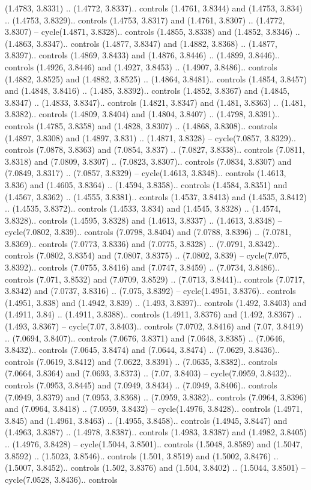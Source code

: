 (1.4783, 3.8331) .. (1.4772, 3.8337).. controls (1.4761, 3.8344) and (1.4753, 3.834) .. (1.4753, 3.8329).. controls (1.4753, 3.8317) and (1.4761, 3.8307) .. (1.4772, 3.8307) -- cycle(1.4871, 3.8328).. controls (1.4855, 3.8338) and (1.4852, 3.8346) .. (1.4863, 3.8347).. controls (1.4877, 3.8347) and (1.4882, 3.8368) .. (1.4877, 3.8397).. controls (1.4869, 3.8433) and (1.4876, 3.8446) .. (1.4899, 3.8446).. controls (1.4926, 3.8446) and (1.4927, 3.8453) .. (1.4907, 3.8486).. controls (1.4882, 3.8525) and (1.4882, 3.8525) .. (1.4864, 3.8481).. controls (1.4854, 3.8457) and (1.4848, 3.8416) .. (1.485, 3.8392).. controls (1.4852, 3.8367) and (1.4845, 3.8347) .. (1.4833, 3.8347).. controls (1.4821, 3.8347) and (1.481, 3.8363) .. (1.481, 3.8382).. controls (1.4809, 3.8404) and (1.4804, 3.8407) .. (1.4798, 3.8391).. controls (1.4785, 3.8358) and (1.4828, 3.8307) .. (1.4868, 3.8308).. controls (1.4897, 3.8308) and (1.4897, 3.831) .. (1.4871, 3.8328) -- cycle(7.0857, 3.8329).. controls (7.0878, 3.8363) and (7.0854, 3.837) .. (7.0827, 3.8338).. controls (7.0811, 3.8318) and (7.0809, 3.8307) .. (7.0823, 3.8307).. controls (7.0834, 3.8307) and (7.0849, 3.8317) .. (7.0857, 3.8329) -- cycle(1.4613, 3.8348).. controls (1.4613, 3.836) and (1.4605, 3.8364) .. (1.4594, 3.8358).. controls (1.4584, 3.8351) and (1.4567, 3.8362) .. (1.4555, 3.8381).. controls (1.4537, 3.8413) and (1.4535, 3.8412) .. (1.4535, 3.8372).. controls (1.4533, 3.834) and (1.4545, 3.8328) .. (1.4574, 3.8328).. controls (1.4595, 3.8328) and (1.4613, 3.8337) .. (1.4613, 3.8348) -- cycle(7.0802, 3.839).. controls (7.0798, 3.8404) and (7.0788, 3.8396) .. (7.0781, 3.8369).. controls (7.0773, 3.8336) and (7.0775, 3.8328) .. (7.0791, 3.8342).. controls (7.0802, 3.8354) and (7.0807, 3.8375) .. (7.0802, 3.839) -- cycle(7.075, 3.8392).. controls (7.0755, 3.8416) and (7.0747, 3.8459) .. (7.0734, 3.8486).. controls (7.071, 3.8532) and (7.0709, 3.8529) .. (7.0713, 3.8441).. controls (7.0717, 3.8342) and (7.0737, 3.8316) .. (7.075, 3.8392) -- cycle(1.4951, 3.8376).. controls (1.4951, 3.838) and (1.4942, 3.839) .. (1.493, 3.8397).. controls (1.492, 3.8403) and (1.4911, 3.84) .. (1.4911, 3.8388).. controls (1.4911, 3.8376) and (1.492, 3.8367) .. (1.493, 3.8367) -- cycle(7.07, 3.8403).. controls (7.0702, 3.8416) and (7.07, 3.8419) .. (7.0694, 3.8407).. controls (7.0676, 3.8371) and (7.0648, 3.8385) .. (7.0646, 3.8432).. controls (7.0645, 3.8474) and (7.0644, 3.8474) .. (7.0629, 3.8436).. controls (7.0619, 3.8412) and (7.0622, 3.8391) .. (7.0635, 3.8382).. controls (7.0664, 3.8364) and (7.0693, 3.8373) .. (7.07, 3.8403) -- cycle(7.0959, 3.8432).. controls (7.0953, 3.8445) and (7.0949, 3.8434) .. (7.0949, 3.8406).. controls (7.0949, 3.8379) and (7.0953, 3.8368) .. (7.0959, 3.8382).. controls (7.0964, 3.8396) and (7.0964, 3.8418) .. (7.0959, 3.8432) -- cycle(1.4976, 3.8428).. controls (1.4971, 3.845) and (1.4961, 3.8463) .. (1.4955, 3.8458).. controls (1.4945, 3.8447) and (1.4963, 3.8387) .. (1.4978, 3.8387).. controls (1.4983, 3.8387) and (1.4982, 3.8405) .. (1.4976, 3.8428) -- cycle(1.5044, 3.8501).. controls (1.5048, 3.8589) and (1.5047, 3.8592) .. (1.5023, 3.8546).. controls (1.501, 3.8519) and (1.5002, 3.8476) .. (1.5007, 3.8452).. controls (1.502, 3.8376) and (1.504, 3.8402) .. (1.5044, 3.8501) -- cycle(7.0528, 3.8436).. controls 